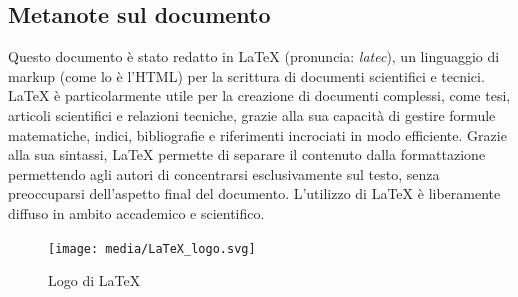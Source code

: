 \documentclass[11pt, a4paper]{article}
\begin{document}
\subsection*{Metanote sul documento}
Questo documento è stato redatto in LaTeX (pronuncia: \textit{latec}), un linguaggio di markup
(come lo è l'HTML) per la scrittura di documenti scientifici e tecnici.
LaTeX è particolarmente utile per la creazione di documenti complessi, come tesi, articoli scientifici e relazioni tecniche, 
grazie alla sua capacità di gestire formule matematiche, indici, bibliografie e riferimenti incrociati in modo efficiente.
Grazie alla sua sintassi, LaTeX permette di separare il contenuto dalla formattazione permettendo
agli autori di concentrarsi esclusivamente sul testo, senza preoccuparsi dell'aspetto final del documento.
L'utilizzo di LaTeX è liberamente diffuso in ambito accademico e scientifico.

\begin{figure}[H]

    \centering
    \texttt{[image: media/LaTeX\_logo.svg]}
    \caption{Logo di LaTeX}
    \label{fig:latex-logo}

\end{figure}
\end{document}
